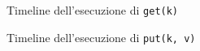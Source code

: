 \documentclass[twoside]{article}
\begin{document}
\begin{multicols}{2}
\begin{figure}[t]
\begin{minipage}[b]{0.48\textwidth}
{{}
}
\caption{Timeline dell'esecuzione di \texttt{get(k)}}
\label{fig:get}
\end{minipage}
\enskip
\begin{minipage}[b]{0.48\textwidth}
\caption{Timeline dell'esecuzione di \texttt{put(k, v)}}
\label{fig:put}
\end{minipage}
\end{figure}

\end{multicols}
\end{document}
